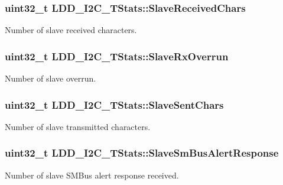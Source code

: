 \subsubsection[{Slave\+Received\+Chars}]{\setlength{\rightskip}{0pt plus 5cm}uint32\+\_\+t L\+D\+D\+\_\+\+I2\+C\+\_\+\+T\+Stats\+::\+Slave\+Received\+Chars}\label{struct_l_d_d___i2_c___t_stats_a1f5f4c88b26ee91ad3ade3182c83b359}
Number of slave received characters. \hypertarget{struct_l_d_d___i2_c___t_stats_afe6c0b4f10465050a22af12bb0d8cd00}{}
\subsubsection[{Slave\+Rx\+Overrun}]{\setlength{\rightskip}{0pt plus 5cm}uint32\+\_\+t L\+D\+D\+\_\+\+I2\+C\+\_\+\+T\+Stats\+::\+Slave\+Rx\+Overrun}\label{struct_l_d_d___i2_c___t_stats_afe6c0b4f10465050a22af12bb0d8cd00}
Number of slave overrun. \hypertarget{struct_l_d_d___i2_c___t_stats_ad4935dd9ff320dcc83fe33f388713c85}{}
\subsubsection[{Slave\+Sent\+Chars}]{\setlength{\rightskip}{0pt plus 5cm}uint32\+\_\+t L\+D\+D\+\_\+\+I2\+C\+\_\+\+T\+Stats\+::\+Slave\+Sent\+Chars}\label{struct_l_d_d___i2_c___t_stats_ad4935dd9ff320dcc83fe33f388713c85}
Number of slave transmitted characters. \hypertarget{struct_l_d_d___i2_c___t_stats_a8013f91bdae1fc4fddf111aa1e2a52ca}{}
\subsubsection[{Slave\+Sm\+Bus\+Alert\+Response}]{\setlength{\rightskip}{0pt plus 5cm}uint32\+\_\+t L\+D\+D\+\_\+\+I2\+C\+\_\+\+T\+Stats\+::\+Slave\+Sm\+Bus\+Alert\+Response}\label{struct_l_d_d___i2_c___t_stats_a8013f91bdae1fc4fddf111aa1e2a52ca}
Number of slave S\+M\+Bus alert response received. \hypertarget{struct_l_d_d___i2_c___t_stats_a134cb9fb9e37217e70e8a93924bca300}{}
